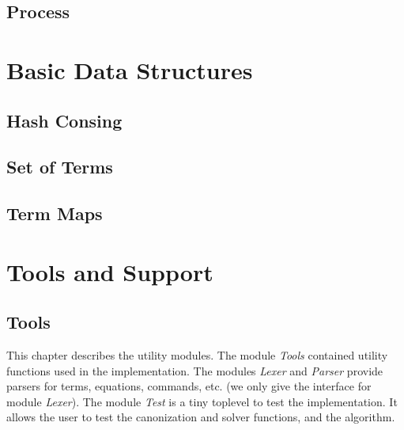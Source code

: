 \documentclass[12pt]{article}
\begin{document}
 

 \subsection{Process}\label{subsec:process}

 

 



\section{Basic Data Structures}\label{sec:data.structures}

  \subsection{Hash Consing}\label{subsec:hashcons}

  

  

  \subsection{Set of Terms}\label{subsec:patricia.sets}

  

  

  \subsection{Term Maps}\label{subsec:patricia.maps}

  

  





\section{Tools and Support}\label{sec:misc}

  \subsection{Tools}\label{subsec:tools}

  This chapter describes the utility modules. The module \textit{Tools}
  contained utility functions used in the implementation. The modules
  \textit{Lexer} and \textit{Parser} provide parsers for terms,
  equations, commands, etc. (we only give the interface for module
  \textit{Lexer}). The module \textit{Test} is a tiny toplevel
  to test the implementation. It allows the user to test the
  canonization and solver functions, and the algorithm.
\end{document}
